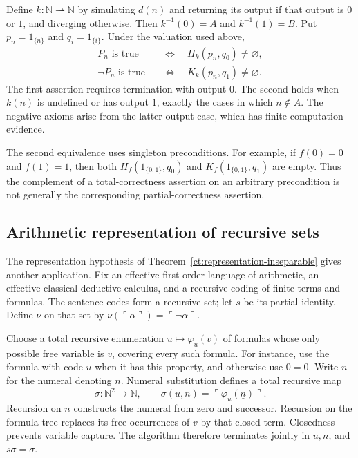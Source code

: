 \documentclass[11pt]{article}
\theoremstyle{definition}
\theoremstyle{remark}
\newcommand{\N}{\mathbb N}
\begin{document}
Define $k:\N\rightharpoonup\N$ by simulating $d(n)$ and returning its
output if that output is $0$ or $1$, and diverging otherwise. Then
$k^{-1}(0)=A$ and $k^{-1}(1)=B$. Put $p_n=1_{\{n\}}$ and
$q_i=1_{\{i\}}$. Under the valuation used above,
\begin{align}
 P_n\text{ is true}
 &\quad\Longleftrightarrow\quad H_k(p_n,q_0)\ne\varnothing,
 \label{num:hoare-positive}\\
 \neg P_n\text{ is true}
 &\quad\Longleftrightarrow\quad K_k(p_n,q_1)\ne\varnothing.
 \label{num:hoare-negative}
\end{align}
The first assertion requires termination with output $0$. The second
holds when $k(n)$ is undefined or has output $1$, exactly the cases in
which $n\notin A$. The negative axioms arise from the latter output
case, which has finite computation evidence.

The second equivalence uses singleton preconditions. For example, if
$f(0)=0$ and $f(1)=1$, then both
$H_f(1_{\{0,1\}},q_0)$ and $K_f(1_{\{0,1\}},q_1)$ are empty.
Thus the complement of a total-correctness assertion on an arbitrary
precondition is not generally the corresponding partial-correctness
assertion.

\subsection{Arithmetic representation of recursive sets}

The representation hypothesis of
Theorem~\ref{ct:representation-inseparable} gives another application.
Fix an effective first-order language of arithmetic, an effective
classical deductive calculus, and a recursive coding of finite terms and
formulas. The sentence codes form a recursive set; let $s$ be its
partial identity. Define $\nu$ on that set by
$\nu(\ulcorner\alpha\urcorner)=\ulcorner\neg\alpha\urcorner$.

Choose a total recursive enumeration $u\mapsto\varphi_u(v)$ of formulas
whose only possible free variable is $v$, covering every such formula.
For instance, use the formula with code $u$ when it has this property,
and otherwise use $0=0$. Write $\underline n$ for the numeral denoting
$n$. Numeral substitution defines a total recursive map
\[
 \sigma:\N^2\longrightarrow\N,\qquad
 \sigma(u,n)=\ulcorner\varphi_u(\underline n)\urcorner.
\]
Recursion on $n$ constructs the numeral from zero and successor.
Recursion on the formula tree replaces its free occurrences of $v$ by
that closed term. Closedness prevents variable capture. The algorithm
therefore terminates jointly in $u,n$, and $s\sigma=\sigma$.
\end{document}
